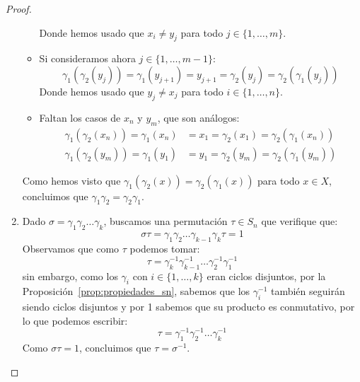 \begin{prop}
\begin{proof}
\begin{enumerate}
\begin{itemize}
\begin{equation*}
                        \end{equation*}
                        Donde hemos usado que $x_i \neq y_j$ para todo $j \in \{1,\ldots,m\}$.
                    \item Si consideramos ahora $j\in \{1,\ldots,m-1\}$:
                        \begin{equation*}
                            \gamma_1(\gamma_2(y_j)) = \gamma_1(y_{j+1}) = y_{j+1} = \gamma_2(y_j) = \gamma_2(\gamma_1(y_j))
                        \end{equation*}
                        Donde hemos usado que $y_j \neq x_j$ para todo $i \in \{1,\ldots,n\}$.
                    \item Faltan los casos de $x_n$ y $y_m$, que son análogos:
                        \begin{align*}
                            \gamma_1(\gamma_2(x_n)) = \gamma_1(x_n) &= x_1 = \gamma_2(x_1) = \gamma_2(\gamma_1(x_n)) \\
                            \gamma_1(\gamma_2(y_m)) = \gamma_1(y_1) &= y_1 = \gamma_2(y_m) = \gamma_2(\gamma_1(y_m))
                        \end{align*}
                \end{itemize}
                Como hemos visto que $\gamma_1(\gamma_2(x)) = \gamma_2(\gamma_1(x))$ para todo $x\in X$, concluimos que $\gamma_1\gamma_2=\gamma_2\gamma_1$.
            \item Dado $\sigma = \gamma_1\gamma_2\ldots\gamma_k$, buscamos una permutación $\tau\in S_n$ que verifique que:
                \begin{equation*}
                    \sigma\tau = \gamma_1\gamma_2\ldots\gamma_{k-1}\gamma_k\tau = 1
                \end{equation*}
                Observamos que como $\tau$ podemos tomar:
                \begin{equation*}
                    \tau = \gamma_k^{-1}\gamma_{k-1}^{-1}\ldots\gamma_2^{-1}\gamma_1^{-1}
                \end{equation*}
                sin embargo, como los $\gamma_i$ con $i \in \{1,\ldots,k\}$ eran ciclos disjuntos, por la Proposición~\ref{prop:propiedades_sn}, sabemos que los $\gamma_i^{-1}$ también seguirán siendo ciclos disjuntos y por 1 sabemos que su producto es conmutativo, por lo que podemos escribir:
                \begin{equation*}
                    \tau = \gamma_1^{-1}\gamma_2^{-1}\ldots\gamma_k^{-1}
                \end{equation*}
                Como $\sigma\tau=1$, concluimos que $\tau = \sigma^{-1}$.
        \end{enumerate}
    \end{proof}
\end{prop}

